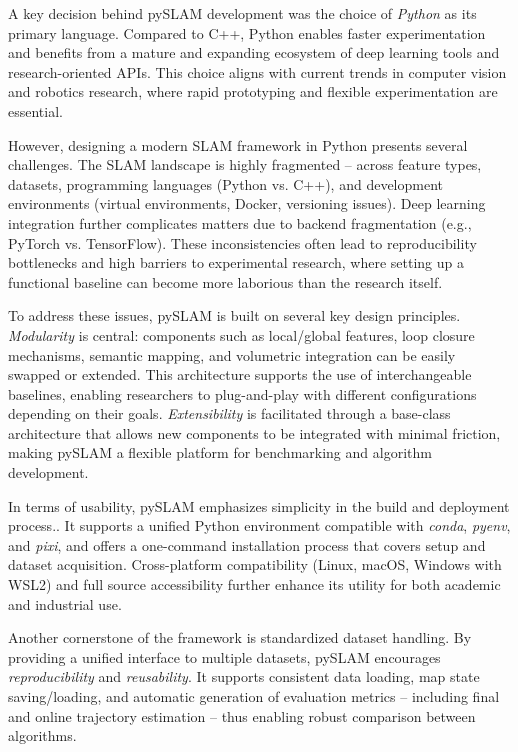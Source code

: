 \documentclass{article}
\begin{document}
A key decision behind pySLAM development was the choice of \textit{Python} as its primary language. Compared to C++, Python enables faster experimentation and benefits from a mature and expanding ecosystem of deep learning tools and research-oriented APIs. This choice aligns with current trends in computer vision and robotics research, where rapid prototyping and flexible experimentation are essential.

However, designing a modern SLAM framework in Python presents several challenges. The SLAM landscape is highly fragmented -- across feature types, datasets, programming languages (Python vs. C++), and development environments (virtual environments, Docker, versioning issues). Deep learning integration further complicates matters due to backend fragmentation (e.g., PyTorch vs. TensorFlow). These inconsistencies often lead to reproducibility bottlenecks and high barriers to experimental research, where setting up a functional baseline can become more laborious than the research itself.

To address these issues, pySLAM is built on several key design principles. \textit{Modularity} is central: components such as local/global features\cite{tuytelaars2008local,joshi2020recent,ma2021image}, loop closure mechanisms\cite{schubert2023visual}, semantic mapping\cite{georgevichsemantic,chen2025semantic,schmid2024khronos}, and volumetric integration\cite{dong2022ash,freda2023plvs} can be easily swapped or extended. This architecture supports the use of interchangeable baselines, enabling researchers to plug-and-play with different configurations depending on their goals. \textit{Extensibility} is facilitated through a base-class architecture that allows new components to be integrated with minimal friction, making pySLAM a flexible platform for benchmarking and algorithm development.

In terms of usability, pySLAM emphasizes simplicity in the build and deployment process.. It supports a unified Python environment compatible with \textit{conda}, \textit{pyenv}, and \textit{pixi}, and offers a one-command installation process that covers setup and dataset acquisition. Cross-platform compatibility (Linux, macOS, Windows with WSL2) and full source accessibility further enhance its utility for both academic and industrial use.

Another cornerstone of the framework is standardized dataset handling. By providing a unified interface to multiple datasets, pySLAM encourages \textit{reproducibility} and \textit{reusability}. It supports consistent data loading, map state saving/loading, and automatic generation of evaluation metrics -- including final and online trajectory estimation -- thus enabling robust comparison between algorithms.
\end{document}
